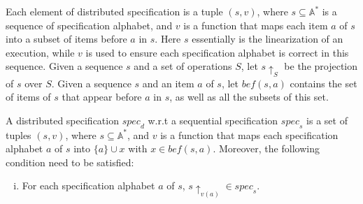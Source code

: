  Each element of distributed specification is a tuple $(s,v)$, where $s \subseteq \mathbb{A}^*$ is a sequence of specification alphabet, and $v$ is a function that maps each item $a$ of $s$ into a subset of items before $a$ in $s$. Here $s$ essentially is the linearization of an execution, while $v$ is used to ensure each specification alphabet is correct in this sequence. %
Given a sequence $s$ and a set of operations $S$, let $s \uparrow_{S}$ be the projection of $s$ over $S$. Given a sequence $s$ and an item $a$ of $s$, let $\mathit{bef}(s,a)$ contains the set of items of $s$ that appear before $a$ in $s$, as well as all the subsets of this set. 

\begin{definition}
\label{definition:distributed specification}
A distributed specification $\mathit{spec}_d$ w.r.t a sequential specification $\mathit{spec}_s$ is a set of tuples $(s,v)$, where $s \subseteq \mathbb{A}^*$, and %
$v$ is a function that maps each specification alphabet $a$ of $s$ into $\{ a \} \cup x$ with $ x \in \mathit{bef}(s,a)$. Moreover, the following condition need to be satisfied:

\begin{enumerate}[(i)]
\item For each specification alphabet $a$ of $s$, $s \uparrow_{v(a)} \in \mathit{spec}_s$. 
\end{enumerate} 
\end{definition}





